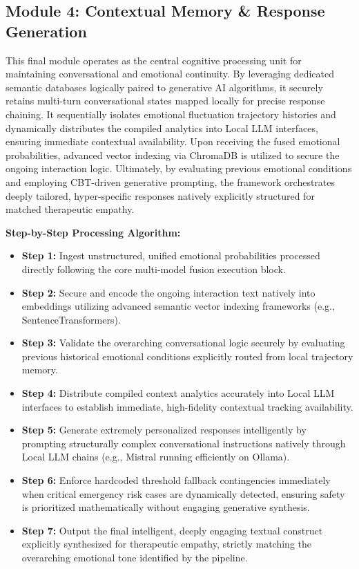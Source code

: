 \documentclass[11pt]{report}
\begin{document}
\subsection{Module 4: Contextual Memory \& Response Generation}
This final module operates as the central cognitive processing unit for maintaining conversational and emotional continuity. By leveraging dedicated semantic databases logically paired to generative AI algorithms, it securely retains multi-turn conversational states mapped locally for precise response chaining. It sequentially isolates emotional fluctuation trajectory histories and dynamically distributes the compiled analytics into Local LLM interfaces, ensuring immediate contextual availability. Upon receiving the fused emotional probabilities, advanced vector indexing via ChromaDB is utilized to secure the ongoing interaction logic. Ultimately, by evaluating previous emotional conditions and employing CBT-driven generative prompting, the framework orchestrates deeply tailored, hyper-specific responses natively explicitly structured for matched therapeutic empathy.

\vspace{0.3cm}
\textbf{Step-by-Step Processing Algorithm:}
\begin{itemize}
    \item \textbf{Step 1:} Ingest unstructured, unified emotional probabilities processed directly following the core multi-model fusion execution block.
    \item \textbf{Step 2:} Secure and encode the ongoing interaction text natively into embeddings utilizing advanced semantic vector indexing frameworks (e.g., SentenceTransformers).
    \item \textbf{Step 3:} Validate the overarching conversational logic securely by evaluating previous historical emotional conditions explicitly routed from local trajectory memory.
    \item \textbf{Step 4:} Distribute compiled context analytics accurately into Local LLM interfaces to establish immediate, high-fidelity contextual tracking availability.
    \item \textbf{Step 5:} Generate extremely personalized responses intelligently by prompting structurally complex conversational instructions natively through Local LLM chains (e.g., Mistral running efficiently on Ollama).
    \item \textbf{Step 6:} Enforce hardcoded threshold fallback contingencies immediately when critical emergency risk cases are dynamically detected, ensuring safety is prioritized mathematically without engaging generative synthesis. 
    \item \textbf{Step 7:} Output the final intelligent, deeply engaging textual construct explicitly synthesized for therapeutic empathy, strictly matching the overarching emotional tone identified by the pipeline.
\end{itemize}
\newpage
\end{document}
